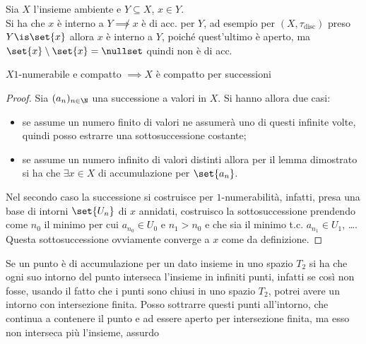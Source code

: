 

\begin{oss}
Sia $X$ l'insieme ambiente e $Y\subseteq X$, $x\in Y$.\\
Si ha che $x$ è interno a $Y \not\implies x$ è di acc. per $Y$, ad esempio per $(X, \tau_\text{disc})$ preso $Y\is\set{x}$ allora $x$ è interno a $Y$, poiché quest'ultimo è aperto, ma $\set{x}\setminus\set{x} = \nullset$ quindi non è di acc.
\end{oss}

\begin{prop}
$X 1$-numerabile e compatto $\implies X$ è compatto per successioni
\end{prop}
\begin{proof}
Sia $(a_n)_{n\in\N}$ una successione a valori in $X$. Si hanno allora due casi:
\begin{itemize}
\item se assume un numero finito di valori ne assumerà uno di questi infinite volte, quindi posso estrarre una sottosuccessione costante;
\item se assume un numero infinito di valori distinti allora per il lemma dimostrato si ha che $\exists x\in X$ di accumulazione per $\set{a_n}$.
\end{itemize}
Nel secondo caso la successione si costruisce per $1$-numerabilità, infatti, presa una base di intorni $\set{U_n}$ di $x$ \wlg annidati, costruisco la sottosuccessione prendendo come $n_0$ il minimo per cui $a_{n_0}\in U_0$ e $n_1 > n_0$ e che sia il minimo t.c. $a_{n_1}\in U_1$, \dots . Questa sottosuccessione ovviamente converge a $x$ come da definizione.
\end{proof}

\begin{oss}
Se un punto è di accumulazione per un dato insieme in uno spazio $T_2$ si ha che ogni suo intorno del punto interseca l'insieme in infiniti punti, infatti se così non fosse, usando il fatto che i punti sono chiusi in uno spazio $T_2$, potrei avere un intorno con intersezione finita. Posso sottrarre questi punti all'intorno, che continua a contenere il punto e ad essere aperto per intersezione finita, ma esso non interseca più l'insieme, assurdo
\end{oss}


